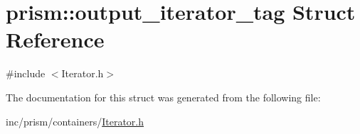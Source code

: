 \hypertarget{structprism_1_1output__iterator__tag}{}\section{prism\+:\+:output\+\_\+iterator\+\_\+tag Struct Reference}
\label{structprism_1_1output__iterator__tag}


{\ttfamily \#include $<$Iterator.\+h$>$}



The documentation for this struct was generated from the following file\+:\begin{DoxyCompactItemize}
\item 
inc/prism/containers/\hyperlink{_iterator_8h}{Iterator.\+h}\end{DoxyCompactItemize}
